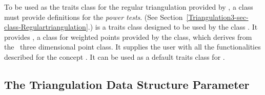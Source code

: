 To be used as the traits class for the regular triangulation provided
by \cgal, a class must provide definitions for the \textit{power tests}.
(See Section~\ref{Triangulation3-sec-class-Regulartriangulation}.)
 is a traits class 
 designed to be used by the class
. It provides
, a class for weighted points
provided by the class, which derives from the \cgal\ three dimensional
point class. It supplies
the user with all the functionalities 
described for the concept . 
 It can be used as a default traits
class for .










\subsection{The Triangulation Data Structure Parameter}
\label{Triangulation3-sec-tds}

